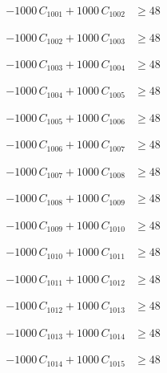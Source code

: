 \documentclass[a4paper,11pt]{article}
\begin{document}
\begin{align}
-1000\,C_{1001} + 1000\,C_{1002} &\geq 48 \nonumber
\end{align}

\begin{align}
-1000\,C_{1002} + 1000\,C_{1003} &\geq 48 \nonumber
\end{align}

\begin{align}
-1000\,C_{1003} + 1000\,C_{1004} &\geq 48 \nonumber
\end{align}

\begin{align}
-1000\,C_{1004} + 1000\,C_{1005} &\geq 48 \nonumber
\end{align}

\begin{align}
-1000\,C_{1005} + 1000\,C_{1006} &\geq 48 \nonumber
\end{align}

\begin{align}
-1000\,C_{1006} + 1000\,C_{1007} &\geq 48 \nonumber
\end{align}

\begin{align}
-1000\,C_{1007} + 1000\,C_{1008} &\geq 48 \nonumber
\end{align}

\begin{align}
-1000\,C_{1008} + 1000\,C_{1009} &\geq 48 \nonumber
\end{align}

\begin{align}
-1000\,C_{1009} + 1000\,C_{1010} &\geq 48 \nonumber
\end{align}

\begin{align}
-1000\,C_{1010} + 1000\,C_{1011} &\geq 48 \nonumber
\end{align}

\begin{align}
-1000\,C_{1011} + 1000\,C_{1012} &\geq 48 \nonumber
\end{align}

\begin{align}
-1000\,C_{1012} + 1000\,C_{1013} &\geq 48 \nonumber
\end{align}

\begin{align}
-1000\,C_{1013} + 1000\,C_{1014} &\geq 48 \nonumber
\end{align}

\begin{align}
-1000\,C_{1014} + 1000\,C_{1015} &\geq 48 \nonumber
\end{align}
\end{document}

